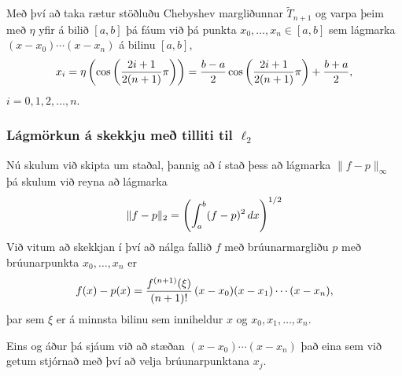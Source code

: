 \documentclass[a4paper,10pt,icelandic]{sphinxmanual}
\begin{document}
Með því að taka rætur stöðluðu Chebyshev margliðunnar
\(\tilde T_{n+1}\) og varpa þeim með \(\eta\) yfir á bilið
\([a,b]\) þá fáum við þá punkta \(x_0,\ldots,x_n \in [a,b]\) sem
lágmarka \((x-x_0)\cdots (x-x_n)\) á bilinu \([a,b]\),
\begin{gather}
\begin{split}x_i = \eta\left(\cos\left(\frac{2i+1}{2(n+1)}\pi\right)\right)
    = \frac{b-a}2 \cos\left(\frac{2i+1}{2(n+1)}\pi\right) + \frac{b+a}2,\end{split}\notag
\end{gather}
\(i=0,1,2,\ldots,n\).


\subsubsection{Lágmörkun á skekkju með tilliti til \(\ell_2\)}
\label{kafli03:lagmorkun-a-skekkju-me-tilliti-til}
Nú skulum við skipta um staðal, þannig að í stað þess að lágmarka
\(\|f-p\|_\infty\) þá skulum við reyna að lágmarka
\begin{gather}
\begin{split}\|f-p\|_2 = \left(\int_a^b (f-p)^2\, dx\right)^{1/2}\end{split}\notag
\end{gather}
Við vitum að skekkjan í því að nálga fallið \(f\) með
brúunarmargliðu \(p\) með brúunarpunkta \(x_0,\ldots,x_n\) er
\begin{gather}
\begin{split}f(x)-p(x) = \frac{f^{(n+1)}(\xi)}{(n+1)!}\, (x-x_0)(x-x_1)\cdots (x-x_n),\end{split}\notag
\end{gather}
þar sem \(\xi\) er á minnsta bilinu sem inniheldur \(x\) og
\(x_0,x_1,\ldots,x_n\).

Eins og áður þá sjáum við að stæðan \((x-x_0)\cdots(x-x_n)\) það
eina sem við getum stjórnað með því að velja brúunarpunktana
\(x_j\).

\end{document}
